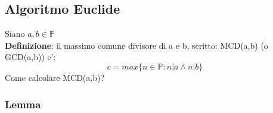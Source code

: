 \documentclass{article}
\begin{document}
    \subsection{Algoritmo Euclide}
    \begin{flushleft}
      Siano $a,b\in \mathbb{P}$ \\ 
      \textbf{Definizione}: il massimo comune divisore di a e b, scritto: MCD(a,b) (o GCD(a,b)) e':
      \begin{equation}
        c = max\{ n \in \mathbb{P}: n|a \land n|b \} 
      \end{equation}
      Come calcolare MCD(a,b)? \\ 
    \end{flushleft}
    \subsubsection{Lemma}
\end{document}
